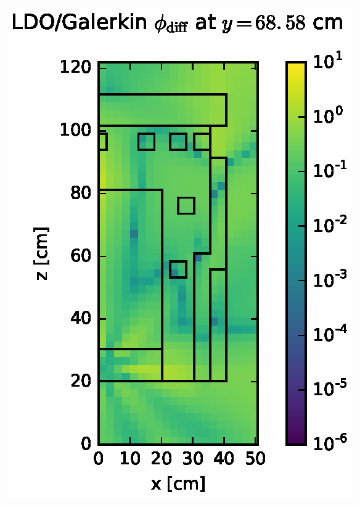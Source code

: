 \documentclass{article} %
\begin{document}
\begin{figure}[!hbt]
\begin{subfigure}{0.4\textwidth}
\includegraphics[max height=0.445\textheight]
{img/dlvn-flux-diff-gkn.eps}
\label{dlvn-fwd-diff-gkn}
\end{subfigure}
\\
\begin{subfigure}{0.4\textwidth}

\end{subfigure}
\end{figure}
\end{document}
